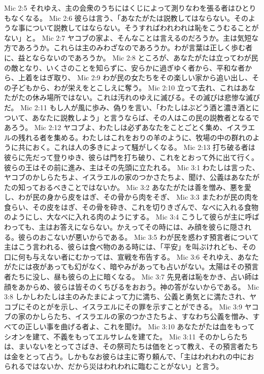 Mic 2:5  それゆえ、主の会衆のうちにはくじによって測りなわを張る者はひとりもなくなる。
Mic 2:6  彼らは言う、「あなたがたは説教してはならない。そのような事について説教してはならない。そうすればわれわれは恥をこうむることがない」と。
Mic 2:7  ヤコブの家よ、そんなことは言えるのだろうか。主は気短な方であろうか。これらは主のみわざなのであろうか。わが言葉は正しく歩む者に、益とならないのであろうか。
Mic 2:8  ところが、あなたがたは立ってわが民の敵となり、いくさのことを知らずに、安らかに過ぎゆく者から、平和な者から、上着をはぎ取り、
Mic 2:9  わが民の女たちをその楽しい家から追い出し、その子どもから、わが栄えをとこしえに奪う。
Mic 2:10  立って去れ、これはあなたがたの休み場所ではない。これは汚れのゆえに滅びる。その滅びは悲惨な滅びだ。
Mic 2:11  もし人が風に歩み、偽りを言い、「わたしはぶどう酒と濃き酒とについて、あなたに説教しよう」と言うならば、その人はこの民の説教者となるであろう。
Mic 2:12  ヤコブよ、わたしは必ずあなたをことごとく集め、イスラエルの残れる者を集める。わたしはこれをおりの羊のように、牧場の中の群れのように共におく。これは人の多きによって騒がしくなる。
Mic 2:13  打ち破る者は彼らに先だって登りゆき、彼らは門を打ち破り、これをとおって外に出て行く。彼らの王はその前に進み、主はその先頭に立たれる。
Mic 3:1  わたしは言った、ヤコブのかしらたちよ、イスラエルの家のつかさたちよ、聞け、公義はあなたがたの知っておるべきことではないか。
Mic 3:2  あなたがたは善を憎み、悪を愛し、わが民の身から皮をはぎ、その骨から肉をそぎ、
Mic 3:3  またわが民の肉を食らい、その皮をはぎ、その骨を砕き、これを切りきざんで、なべに入れる食物のようにし、大なべに入れる肉のようにする。
Mic 3:4  こうして彼らが主に呼ばわっても、主はお答えにならない。かえってその時には、み顔を彼らに隠される。彼らのおこないが悪いからである。
Mic 3:5  わが民を惑わす預言者について主はこう言われる、彼らは食べ物のある時には、「平安」を叫ぶけれども、その口に何も与えない者にむかっては、宣戦を布告する。
Mic 3:6  それゆえ、あなたがたには夜があっても幻がなく、暗やみがあっても占いがない。太陽はその預言者たちに没し、昼も彼らの上に暗くなる。
Mic 3:7  先見者は恥をかき、占い師は顔をあからめ、彼らは皆そのくちびるをおおう。神の答がないからである。
Mic 3:8  しかしわたしは主のみたまによって力に満ち、公義と勇気とに満たされ、ヤコブにそのとがを示し、イスラエルにその罪を示すことができる。
Mic 3:9  ヤコブの家のかしらたち、イスラエルの家のつかさたちよ、すなわち公義を憎み、すべての正しい事を曲げる者よ、これを聞け。
Mic 3:10  あなたがたは血をもってシオンを建て、不義をもってエルサレムを建てた。
Mic 3:11  そのかしらたちは、まいないをとってさばき、その祭司たちは価をとって教え、その預言者たちは金をとって占う。しかもなお彼らは主に寄り頼んで、「主はわれわれの中におられるではないか、だから災はわれわれに臨むことがない」と言う。
